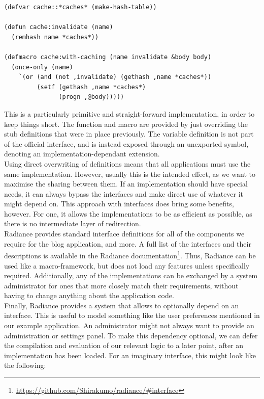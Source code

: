 \documentclass{sig-alternate}
\begin{document}
\begin{verbatim}
(defvar cache::*caches* (make-hash-table))

(defun cache:invalidate (name)
  (remhash name *caches*))

(defmacro cache:with-caching (name invalidate &body body)
  (once-only (name)
    `(or (and (not ,invalidate) (gethash ,name *caches*))
         (setf (gethash ,name *caches*)
               (progn ,@body)))))
\end{verbatim}

This is a particularly primitive and straight-forward implementation, in order to keep things short. The function and macro are provided by just overriding the stub definitions that were in place previously. The variable definition is not part of the official interface, and is instead exposed through an unexported symbol, denoting an implementation-dependant extension. \\

Using direct overwriting of definitions means that all applications must use the same implementation. However, usually this is the intended effect, as we want to maximise the sharing between them. If an implementation should have special needs, it can always bypass the interfaces and make direct use of whatever it might depend on. This approach with interfaces does bring some benefits, however. For one, it allows the implementations to be as efficient as possible, as there is no intermediate layer of redirection. \\

Radiance provides standard interface definitions for all of the components we require for the blog application, and more. A full list of the interfaces and their descriptions is available in the Radiance documentation\footnote{\url{https://github.com/Shirakumo/radiance/\#interface}}. Thus, Radiance can be used like a macro-framework, but does not load any features unless specifically required. Additionally, any of the implementations can be exchanged by a system administrator for ones that more closely match their requirements, without having to change anything about the application code.\\

Finally, Radiance provides a system that allows to optionally depend on an interface. This is useful to model something like the user preferences mentioned in our example application. An administrator might not always want to provide an administration or settings panel. To make this dependency optional, we can defer the compilation and evaluation of our relevant logic to a later point, after an implementation has been loaded. For an imaginary  interface, this might look like the following:
\end{document}
